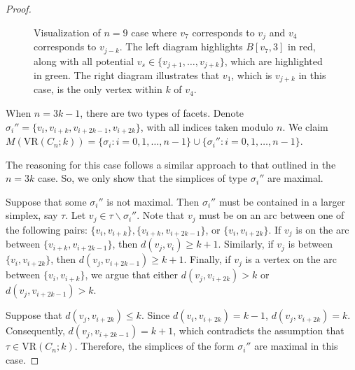 \documentclass[12pt,a4paper]{amsart}
\theoremstyle{definition}
\newcommand{\vr}[2]{\mathrm{VR}(#1;#2)}
\newcommand{\note}[1]{\textcolor{blue}{({#1})}}
\numberwithin{equation}{section}
\begin{document}
\begin{proof}
\begin{figure}[h]
\begin{center}
\caption{Visualization of $n=9$ case where $v_7$ corresponds to $v_j$ and $v_4$ corresponds to $v_{j-k}$.
The left diagram highlights $B[v_7,3]$ in red, along with all potential $v_s\in\{v_{j+1}, \ldots, v_{j+k}\}$, which are highlighted in green.
The right diagram illustrates that $v_1$, which is $v_{j+k}$ in this case, is the only vertex within $k$ of $v_4$.}
\label{fig:9casekball}
\end{center}
\end{figure}


When $n=3k-1$, there are two types of facets.
Denote $\sigma_i''=\{v_i, v_{i+k}, v_{i+2k-1}, v_{i+2k}\}$, with all indices taken modulo $n$.
We claim
$M(\vr{C_{n}}{k})=\{\sigma_i:i=0, 1,\ldots, n-1\} \cup \{\sigma_i'': i=0, 1,\ldots, n-1\}$.

The reasoning for this case follows a similar approach to that outlined in the $n=3k$ case.
So, we only show that the simplices of type $\sigma_i''$ are maximal.

Suppose that some $\sigma_i''$ is not maximal.
Then $\sigma_i''$ must be contained in a larger simplex, say $\tau$.
Let $v_j\in \tau\backslash \sigma_i''$.
Note that $v_j$ must be on an arc between one of the following pairs: $\{v_i,v_{i+k}\}, \{v_{i+k}, v_{i+2k-1}\}$, or $\{v_i,v_{i+2k}\}$.
If $v_j$ is on the arc between $\{v_{i+k}, v_{i+2k-1}\}$, then $d(v_j, v_i)\geq k+1$.
Similarly, if $v_j$ is between $\{v_i,v_{i+2k}\}$, then $d(v_j,v_{i+2k-1})\geq k+1$.
Finally, if $v_j$ is a vertex on the arc between $\{v_i,v_{i+k}\}$, we argue that either $d(v_j, v_{i+2k})>k$ or $d(v_j, v_{i+2k-1})>k$.

Suppose that $d(v_j, v_{i+2k})\leq k$.
Since $d(v_i,v_{i+2k})=k-1$, $d(v_j, v_{i+2k})=k$.
Consequently, $d(v_j, v_{i+2k-1})=k+1$, which contradicts the assumption that $\tau\in\vr{C_n}{k}$.
Therefore, the simplices of the form $\sigma_i''$ are maximal in this case.
\end{proof}
\end{document}

